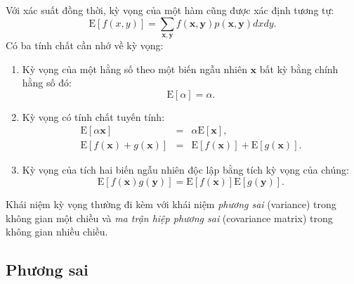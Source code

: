 \documentclass[12pt,a4paper,oneside]{report}
\numberwithin{equation}{section}
\begin{document}
Với xác suất đồng thời, kỳ vọng của một hàm cũng được xác định tương tự:
\begin{equation}
	\label{eqn:30_24}
	\text{E}[f(x, y)] = \sum_{\mathbf{x,y}} f(\mathbf{x, y}) p(\mathbf{x, y}) dx dy.
\end{equation}
Có ba tính chất cần nhớ về kỳ vọng:
\begin{enumerate}
	\item Kỳ vọng của một hằng số theo một biến ngẫu nhiên $\mathbf{x}$ bất kỳ bằng chính hằng số đó:
	\begin{equation}
		\label{eqn:30_25}
		\text{E}[\alpha] = \alpha.
	\end{equation}
	\item Kỳ vọng có tính chất tuyến tính:
	\begin{eqnarray}
		\label{eqn:30_26}
		\text{E}[\alpha \mathbf{x}] & = & \alpha \text{E}[\mathbf{x}],  \\
		\label{eqn:30_27}
		\text{E}[f(\mathbf{x}) + g(\mathbf{x})] & = & \text{E}[f(\mathbf{x})] + \text{E}[g(\mathbf{x})].
	\end{eqnarray}
	\item Kỳ vọng của tích hai biến ngẫu nhiên độc lập bằng tích kỳ vọng của chúng:
	\begin{equation}
		\label{eqn:30_28}
		\text{E}[f(\mathbf{x}) g(\mathbf{y})] = \text{E}[f(\mathbf{x})] \text{E}[g(\mathbf{y})].
	\end{equation}
	
\end{enumerate}



Khái niệm kỳ vọng thường đi kèm với khái niệm \textit{phương
	sai} (variance) trong không gian một chiều và \textit{ma trận hiệp
	phương sai} (covariance matrix) trong không gian nhiều chiều. 

\subsection{Phương sai} %
\end{document}

